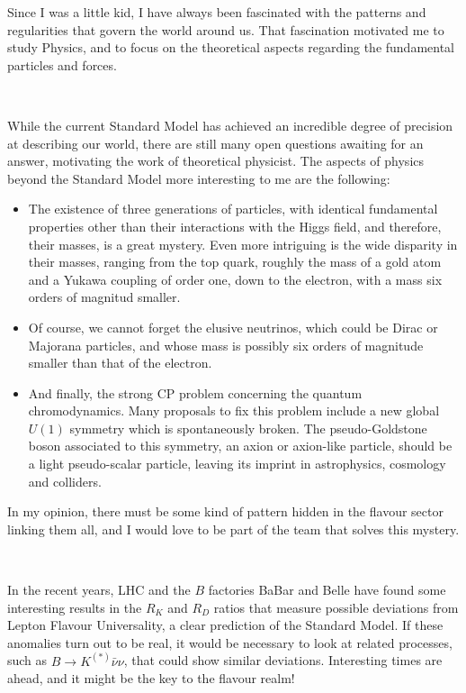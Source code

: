 \documentclass[12pt, a4paper]{article}
\begin{document}
Since I was a little kid, I have always been fascinated with the patterns and regularities that govern the world around us. That fascination motivated me to study Physics, and to focus on the theoretical aspects regarding the fundamental particles and forces.

{}~

While the current Standard Model has achieved an incredible degree of precision at describing our world, there are still many open questions awaiting for an answer, motivating the work of theoretical physicist. The aspects of physics beyond the Standard Model more interesting to me are the following:
\begin{itemize}
\item The existence of three generations of particles, with identical fundamental properties other than their interactions with the Higgs field, and therefore, their masses, is a great mystery. Even more intriguing is the wide disparity in their masses, ranging from the top quark, roughly the mass of a gold atom and a Yukawa coupling of order one, down to the electron, with a mass six orders of magnitud smaller.
\item Of course, we cannot forget the elusive neutrinos, which could be Dirac or Majorana particles, and whose mass is possibly six orders of magnitude smaller than that of the electron.
\item And finally, the strong CP problem concerning the quantum chromodynamics. Many proposals to fix this problem include a new global $U(1)$ symmetry which is spontaneously broken. The pseudo-Goldstone boson associated to this symmetry, an axion or axion-like particle, should be a light pseudo-scalar particle, leaving its imprint in astrophysics, cosmology and colliders.
\end{itemize}
  In my opinion, there must be some kind of pattern hidden in the flavour sector linking them all, and I would love to be part of the team that solves this mystery.

{}~


In the recent years, LHC and the $B$ factories BaBar and Belle have found some interesting results in the $R_K$ and $R_D$ ratios that measure possible deviations from Lepton Flavour Universality, a clear prediction of the Standard Model. If these anomalies turn out to be real, it would be necessary to look at related processes, such as $B\to K^{(*)} \bar{\nu}\nu$, that could show similar deviations. Interesting times are ahead, and it might be the key to the flavour realm!
\end{document}
